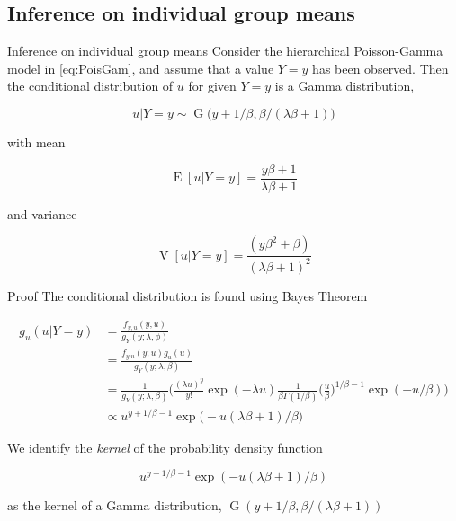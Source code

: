 \documentclass[aspectratio=169]{beamer}
\DeclareMathOperator{\E}{E}
\DeclareMathOperator{\V}{V}
\DeclareMathOperator{\G}{G}
\begin{document}
\hypertarget{inference-on-individual-group-means}{%
\subsection{Inference on individual group
means}\label{inference-on-individual-group-means}}

\begin{frame}{Inference on individual group means}
Consider the hierarchical Poisson-Gamma model in \eqref{eq:PoisGam}, and
assume that a value \(Y=y\) has been observed. Then the conditional
distribution of \(u\) for given \(Y=y\) is a Gamma distribution,

\begin{equation}
  u|Y=y\sim \G\big(y+1/\beta,\beta/(\lambda \beta+1)\big)
\end{equation}

with mean

\begin{equation}
  \E[u|Y=y]=\frac{y\beta+1}{\lambda\beta+1}
\end{equation}

and variance

\begin{equation}
  \V[u|Y=y]=\frac{(y \beta^2+\beta)}{(\lambda \beta + 1)^2}
\end{equation}
\end{frame}

\begin{frame}{Proof}
\protect\hypertarget{proof-3}{}
The conditional distribution is found using Bayes Theorem

\begin{equation}
  \begin{aligned}
    g_{u}(u|Y=y)&=\frac{f_{y,u}(y,u)}{g_Y(y;\lambda, \phi)} \\
    &=\frac{f_{y|u}(y;u)g_{u}(u)}{g_{Y}(y;\lambda,\beta)} \\
    &=\frac{1}{g_{Y}(y;\lambda,\beta)}\bigg(\frac{(\lambda u)^y}{y!} \exp (-\lambda u) \frac{1}{\beta \Gamma(1/\beta)} \bigg(\frac{u}{\beta}\bigg)^{1/\beta-1} \exp (-u/\beta)\bigg) \\
    &\propto u^{y+1/\beta-1} \exp \big(- u(\lambda\beta+1)/\beta\big)
  \end{aligned}
\end{equation}

We identify the \emph{kernel} of the probability density function

\begin{equation}
  u^{y+1/\beta-1} \exp (- u(\lambda\beta+1)/\beta)
\end{equation}

as the kernel of a Gamma distribution,
\(\G(y+1/\beta,\beta/(\lambda\beta+1))\)
\end{frame}
\end{document}
